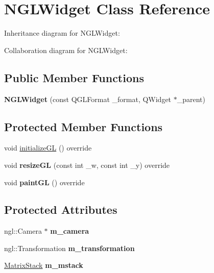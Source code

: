 \hypertarget{class_n_g_l_widget}{}\section{N\+G\+L\+Widget Class Reference}
\label{class_n_g_l_widget}


Inheritance diagram for N\+G\+L\+Widget\+:


Collaboration diagram for N\+G\+L\+Widget\+:
\subsection*{Public Member Functions}
\begin{DoxyCompactItemize}
\item 
\mbox{\label{class_n_g_l_widget_a4baf2eaa1da0fc7494e81b44fb1c98eb}} 
{\bfseries N\+G\+L\+Widget} (const Q\+G\+L\+Format \+\_\+format, Q\+Widget $\ast$\+\_\+parent)
\end{DoxyCompactItemize}
\subsection*{Protected Member Functions}
\begin{DoxyCompactItemize}
\item 
void \hyperlink{class_n_g_l_widget_ac31af2f94e34f15d050247d2c07cb10a}{initialize\+GL} () override
\item 
\mbox{\label{class_n_g_l_widget_afb490c3ed8acb157c92d5a508cc2c93c}} 
void {\bfseries resize\+GL} (const int \+\_\+w, const int \+\_\+y) override
\item 
\mbox{\label{class_n_g_l_widget_aa8fa370086864d45d086f0f470ede068}} 
void {\bfseries paint\+GL} () override
\end{DoxyCompactItemize}
\subsection*{Protected Attributes}
\begin{DoxyCompactItemize}
\item 
\mbox{\label{class_n_g_l_widget_a492132f7d3856100cc7c39ed079e2389}} 
ngl\+::\+Camera $\ast$ {\bfseries m\+\_\+camera}
\item 
\mbox{\label{class_n_g_l_widget_a34f15478b31ea007e9ad98612ef77d42}} 
ngl\+::\+Transformation {\bfseries m\+\_\+transformation}
\item 
\mbox{\label{class_n_g_l_widget_a73bb93427fb43b27be78f811c4a393a3}} 
\hyperlink{class_matrix_stack}{Matrix\+Stack} {\bfseries m\+\_\+mstack}
\end{DoxyCompactItemize}



